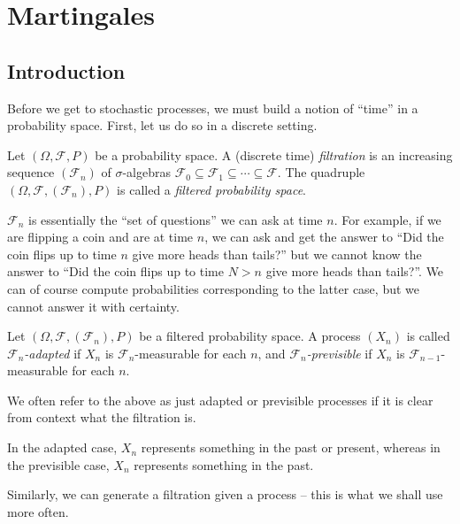 \section{Martingales}

	\subsection{Introduction}

		Before we get to stochastic processes, we must build a notion of ``time'' in a probability space. First, let us do so in a discrete setting.

		\begin{fdef}
			Let $(\Omega,\mathcal{F},P)$ be a probability space. A (discrete time) \textit{filtration} is an increasing sequence $(\mathcal{F}_n)$ of $\sigma$-algebras $\mathcal{F}_0\subseteq\mathcal{F}_1\subseteq\cdots\subseteq\mathcal{F}$. The quadruple $(\Omega,\mathcal{F},(\mathcal{F}_n),P)$ is called a \textit{filtered probability space}.
		\end{fdef}

		$\mathcal{F}_n$ is essentially the ``set of questions'' we can ask at time $n$. For example, if we are flipping a coin and are at time $n$, we can ask and get the answer to ``Did the coin flips up to time $n$ give more heads than tails?'' but we cannot know the answer to ``Did the coin flips up to time $N>n$ give more heads than tails?''. We can of course compute probabilities corresponding to the latter case, but we cannot answer it with certainty.

		\begin{definition}
			\label{def: adapted and previsible}
			Let $(\Omega,\mathcal{F},(\mathcal{F}_n),P)$ be a filtered probability space. A process $(X_n)$ is called \textit{$\mathcal{F}_n$-adapted} if $X_n$ is $\mathcal{F}_n$-measurable for each $n$, and \textit{$\mathcal{F}_n$-previsible} if $X_n$ is $\mathcal{F}_{n-1}$-measurable for each $n$.
		\end{definition}

		We often refer to the above as just adapted or previsible processes if it is clear from context what the filtration is.

		In the adapted case, $X_n$ represents something in the past or present, whereas in the previsible case, $X_n$ represents something in the past.

		Similarly, we can generate a filtration given a process -- this is what we shall use more often.

